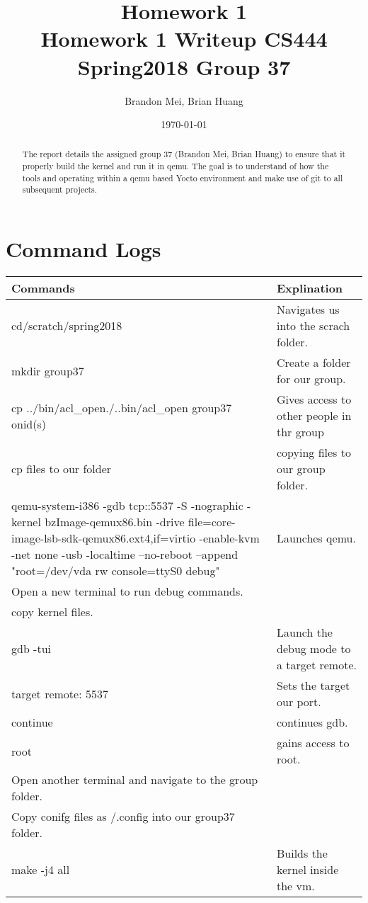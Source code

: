 \documentclass[onecolumn, draftclsnofoot, 10pt, titlepage, compsoc]{IEEEtran}
\title
{%
	Homework 1 \\
	\vspace{0.4cm}
	\large Homework 1 Writeup
	\vspace{0.4cm}
	\large CS444 Spring2018 Group 37
}
\author{Brandon Mei, Brian Huang}
\date{\today}
\begin{document}
\maketitle

\begin{abstract}
The report details the assigned group 37 (Brandon Mei, Brian Huang) to ensure that it properly build the kernel and run it in qemu. The goal is to understand of how the tools and operating within a qemu based Yocto environment and make use of git to all subsequent projects.  
\end{abstract}

\section*{Command Logs}
\begin{tabular}{ | p{5cm} | p{5cm} | }
		\hline
		\textbf{Commands} & \textbf{Explination} \\
		\hline
		\hline
		cd/scratch/spring2018 & Navigates us into the scrach folder. \\
		\hline
		mkdir group37 & Create a folder for our group. \\
		\hline
		cp ../bin/acl\_open./..bin/acl\_open group37 onid(s) & Gives access to other people in thr group \\
		\hline
		cp files to our folder & copying files to our group folder.\\
		\hline
		qemu-system-i386 -gdb tcp::5537 -S -nographic -kernel bzImage-qemux86.bin -drive file=core-image-lsb-sdk-qemux86.ext4,if=virtio -enable-kvm -net none -usb -localtime --no-reboot --append "root=/dev/vda rw console=ttyS0 debug" & Launches qemu.\\
		\hline
		Open a new terminal to run debug commands. & \\
		\hline
		copy kernel files. & \\
		\hline
		gdb -tui & Launch the debug mode to a target remote. \\
		\hline
		target remote: 5537 & Sets the target our port. \\
		\hline
		continue & continues gdb. \\
		\hline
		root & gains access to root. \\
		\hline
		Open another terminal and navigate to the group folder. & \\
		\hline
		Copy conifg files as /.config into our group37 folder. & \\
		\hline
		make -j4 all & Builds the kernel inside the vm. \\
		\hline
		
	\end{tabular} 
\end{document}
